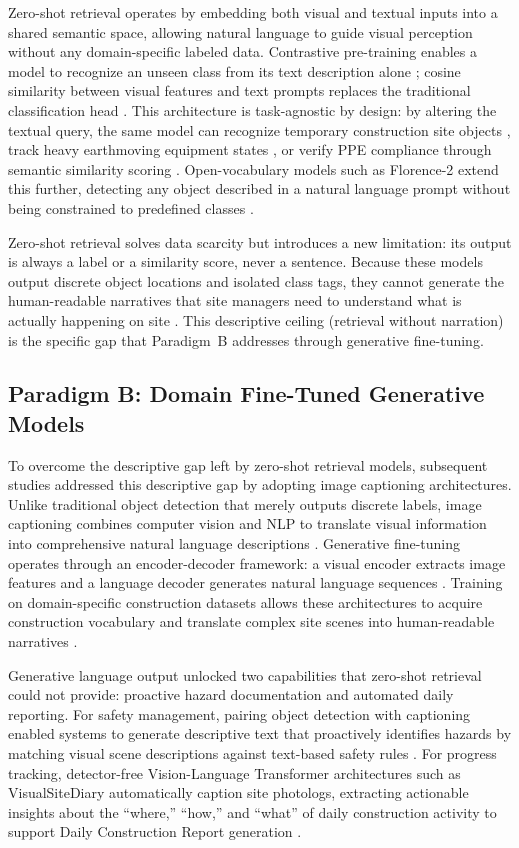 \documentclass[10pt,letterpaper]{article}
\begin{document}
Zero-shot retrieval operates by embedding both visual and textual inputs into a shared semantic space, allowing natural language to guide visual perception without any domain-specific labeled data. Contrastive pre-training enables a model to recognize an unseen class from its text description alone \cite{gil2024}; cosine similarity between visual features and text prompts replaces the traditional classification head \cite{liang2024}. This architecture is task-agnostic by design: by altering the textual query, the same model can recognize temporary construction site objects \cite{liang2024}, track heavy earthmoving equipment states \cite{jeoung2025}, or verify PPE compliance through semantic similarity scoring \cite{gil2024}. Open-vocabulary models such as Florence-2 extend this further, detecting any object described in a natural language prompt without being constrained to predefined classes \cite{jeoung2025}.

Zero-shot retrieval solves data scarcity but introduces a new limitation: its output is always a label or a similarity score, never a sentence. Because these models output discrete object locations and isolated class tags, they cannot generate the human-readable narratives that site managers need to understand what is actually happening on site \cite{bui2026}. This descriptive ceiling (retrieval without narration) is the specific gap that Paradigm~B addresses through generative fine-tuning.

\subsection{Paradigm B: Domain Fine-Tuned Generative Models}

To overcome the descriptive gap left by zero-shot retrieval models, subsequent studies addressed this descriptive gap by adopting image captioning architectures. Unlike traditional object detection that merely outputs discrete labels, image captioning combines computer vision and NLP to translate visual information into comprehensive natural language descriptions \cite{liu2020}. Generative fine-tuning operates through an encoder-decoder framework: a visual encoder extracts image features and a language decoder generates natural language sequences \cite{xiao2022}. Training on domain-specific construction datasets allows these architectures to acquire construction vocabulary and translate complex site scenes into human-readable narratives \cite{liu2020}.

Generative language output unlocked two capabilities that zero-shot retrieval could not provide: proactive hazard documentation and automated daily reporting. For safety management, pairing object detection with captioning enabled systems to generate descriptive text that proactively identifies hazards by matching visual scene descriptions against text-based safety rules \cite{wangxiao2024}. For progress tracking, detector-free Vision-Language Transformer architectures such as VisualSiteDiary automatically caption site photologs, extracting actionable insights about the ``where,'' ``how,'' and ``what'' of daily construction activity to support Daily Construction Report generation \cite{jung2024}.
\end{document}
